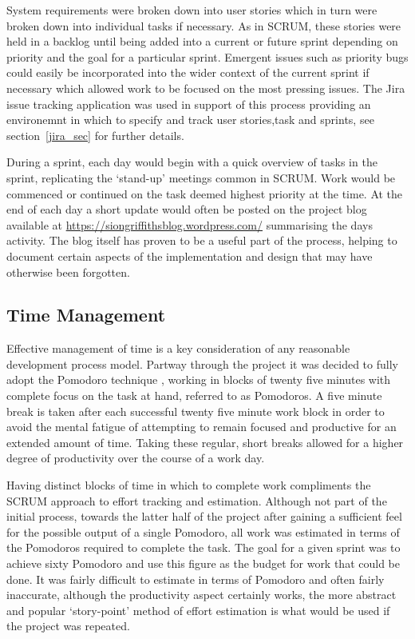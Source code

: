 System requirements were broken down into user stories which in turn were broken down into individual tasks if necessary. As in SCRUM, these stories were held in a backlog until being added into a current or future sprint depending on priority and the goal for a particular sprint. Emergent issues such as priority bugs could easily be incorporated into the wider context of the current sprint if necessary which allowed work to be focused on the most pressing issues. The Jira \cite{jira} issue tracking application was used in support of this process providing an environemnt in which to specify and track user stories,task and sprints, see section~\ref{jira_sec} for further details. 

During a sprint, each day would begin with a quick overview of tasks in the sprint, replicating the `stand-up' meetings common in SCRUM. Work would be commenced or continued on the task deemed highest priority at the time. At the end of each day a short update would often be posted on the project blog available at \url{https://siongriffithsblog.wordpress.com/} summarising the days activity. The blog itself has proven to be a useful part of the process, helping to document certain aspects of the implementation and design that may have otherwise been forgotten.


\subsection{Time Management}
Effective management of time is a key consideration of any reasonable development process model. Partway through the project it was decided to fully adopt the Pomodoro technique \cite{pomodoro}, working in blocks of twenty five minutes with complete focus on the task at hand, referred to as Pomodoros. A five minute break is taken after each successful twenty five minute work block in order to avoid the mental fatigue of attempting to remain focused and productive for an extended amount of time. Taking these regular, short breaks allowed for a higher degree of productivity over the course of a work day.

Having distinct blocks of time in which to complete work compliments the SCRUM approach to effort tracking and estimation. Although not part of the initial process, towards the latter half of the project after gaining a sufficient feel for the possible output of a single Pomodoro, all work was estimated in terms of the Pomodoros required to complete the task. The goal for a given sprint was to achieve sixty Pomodoro and use this figure as the budget for work that could be done. It was fairly difficult to estimate in terms of Pomodoro and often fairly inaccurate, although the productivity aspect certainly works, the more abstract and popular `story-point' method of effort estimation is what would be used if the project was repeated.

